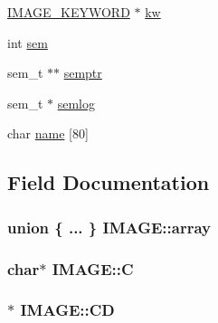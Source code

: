 \begin{DoxyCompactItemize}
\begin{tabbing}
\end{tabbing}\item 
\hyperlink{structIMAGE__KEYWORD}{I\+M\+A\+G\+E\+\_\+\+K\+E\+Y\+W\+O\+R\+D} $\ast$ \hyperlink{structIMAGE_aeec1ba7287c93dc589e38c4b1479b967}{kw}
\item 
int \hyperlink{structIMAGE_a6a50020081f8e319972497690237fb66}{sem}
\item 
sem\+\_\+t $\ast$$\ast$ \hyperlink{structIMAGE_a85b29e7531f0e07a5f68dbea97a14477}{semptr}
\item 
sem\+\_\+t $\ast$ \hyperlink{structIMAGE_a9862b2c9defbf6a47a982da827048ed1}{semlog}
\item 
char \hyperlink{structIMAGE_ab141d7fe6a4c6c197f0200599f69b1f7}{name} \mbox{[}80\mbox{]}
\end{DoxyCompactItemize}


\subsection{Field Documentation}
\hypertarget{structIMAGE_a8a451a2074b51df5b761088baf49cc3f}{}
\subsubsection[{array}]{\setlength{\rightskip}{0pt plus 5cm}union \{ ... \}   I\+M\+A\+G\+E\+::array}\label{structIMAGE_a8a451a2074b51df5b761088baf49cc3f}
\hypertarget{structIMAGE_ac8837a25e2fde9748fbb1e9951ed8243}{}
\subsubsection[{C}]{\setlength{\rightskip}{0pt plus 5cm}char$\ast$ I\+M\+A\+G\+E\+::\+C}\label{structIMAGE_ac8837a25e2fde9748fbb1e9951ed8243}
\hypertarget{structIMAGE_a87e4a923342b434dacfdead3d3949dae}{}
\subsubsection[{C\+D}]{$\ast$ I\+M\+A\+G\+E\+::\+C\+D}\label{structIMAGE_a87e4a923342b434dacfdead3d3949dae}
\hypertarget{structIMAGE_a511ca0aa5f2af1a79ee4d217abf08745}{}
